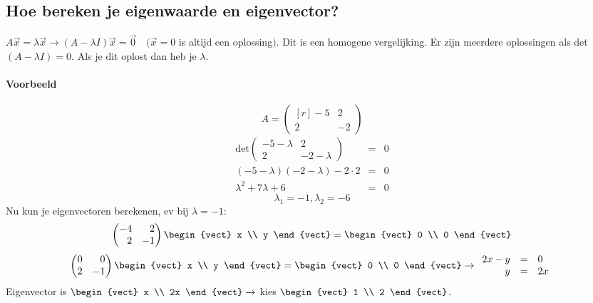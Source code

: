\subsection{Hoe bereken je eigenwaarde en eigenvector?}
$A \vec{x} = \lambda \vec{x} \to (A - \lambda I) \vec{x} = \vec{0} \quad (\vec{x} = 0$ is altijd een oplossing$)$. Dit is een homogene vergelijking. Er zijn meerdere oplossingen als det$(A - \lambda I) = 0$. Als je dit oplost dan heb je $\lambda$.

\paragraph{Voorbeeld}
\[A = \begin{pmatrix*}[r] -5 & 2 \\ 2 & -2 \end{pmatrix*} \]
\begin{eqnarray*}
	\mbox{det} \begin{pmatrix}
		-5 - \lambda & 2 \\
		2 & -2 - \lambda
	\end{pmatrix} &=& 0 \\
	(-5-\lambda)(-2 - \lambda) - 2 \cdot 2 &=& 0 \\
	\lambda^2 + 7 \lambda + 6 &=& 0
\end{eqnarray*}
\[ \lambda_1 = -1, \lambda_2 = -6 \]
Nu kun je eigenvectoren berekenen, ev bij $\lambda = -1$:
\[ \begin{pmatrix*}[r] -4 & 2 \\ 2 & -1 \end{pmatrix*} \begin{vect} x \\ y \end{vect} = \begin{vect} 0 \\ 0 \end{vect} \]
\[ \begin{pmatrix*}[r] 0 & 0 \\ 2 & -1 \end{pmatrix*} \begin{vect} x \\ y \end{vect} = \begin{vect} 0 \\ 0 \end{vect} \to \begin{array}{rcl}
	2x - y &=& 0 \\
	y &=& 2x
\end{array} \]
Eigenvector is $\begin{vect} x \\ 2x \end{vect} \to$ kies $\begin{vect} 1 \\ 2 \end{vect}$.
